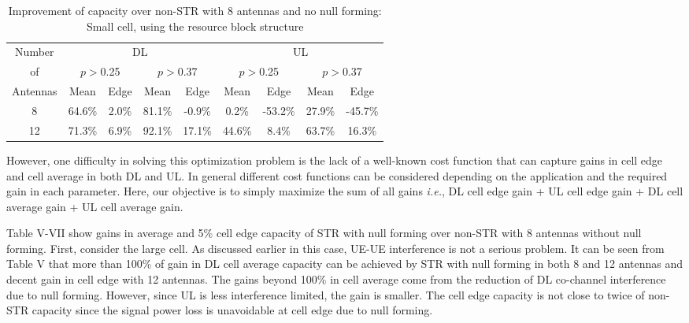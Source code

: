 \documentclass[twocolumn]{IEEEtran}
\begin{document}
\begin{center}
\begin{table*}[ht]
\centering \caption{Improvement of capacity over non-STR with 8
antennas and no null forming: Small cell, using the resource block
structure}
\begin{small}
\begin{tabular}{c||c|c|c|c||c|c|c|c}
\hline
  \hline
Number &\multicolumn{4}{c||}{DL}  &\multicolumn{4}{c}{UL}  \\
    \cline{2-9}
 of   & \multicolumn{2}{c|}{$p>$0.25} & \multicolumn{2}{c||}{$p>$0.37} & \multicolumn{2}{c|}{$p>$0.25} & \multicolumn{2}{c}{$p>$0.37}\\
\cline{2-9}
 Antennas & Mean & Edge & Mean & Edge & Mean & Edge & Mean & Edge \\
  \hline
  \hline
  8 & 64.6\% & 2.0\% & 81.1\% & -0.9\% & 0.2\% & -53.2\% & 27.9\% & -45.7\% \\
 12 & 71.3\% & 6.9\% & 92.1\% & 17.1\% &44.6\% &   8.4\% & 63.7\% & 16.3\% \\
\hline \hline
\end{tabular}
\end{small}
\end{table*}
\end{center}


However, one difficulty in solving this optimization problem is the
lack of a well-known cost function that can capture gains in cell
edge and cell average in both DL and UL. In general different cost
functions can be considered depending on the application and the
required gain in each parameter. Here, our objective is to simply
maximize the sum of all gains \emph{i.e.}, DL cell edge gain + UL
cell edge gain + DL cell average gain + UL cell average gain.

Table V-VII show gains in average and 5\% cell edge capacity of STR
with null forming over non-STR with 8 antennas without null forming.
First, consider the large cell. As discussed earlier in this case,
UE-UE interference is not a serious problem. It can be seen from
Table V that more than 100\% of gain in DL cell average capacity can
be achieved by STR with null forming in both 8 and 12 antennas and
decent gain in cell edge with 12 antennas. The gains beyond 100\% in
cell average come from the reduction of DL co-channel interference
due to null forming. However, since UL is less interference limited,
the gain is smaller. The cell edge capacity is not close to twice of
non-STR capacity since the signal power loss is unavoidable at cell
edge due to null forming.
\end{document}

